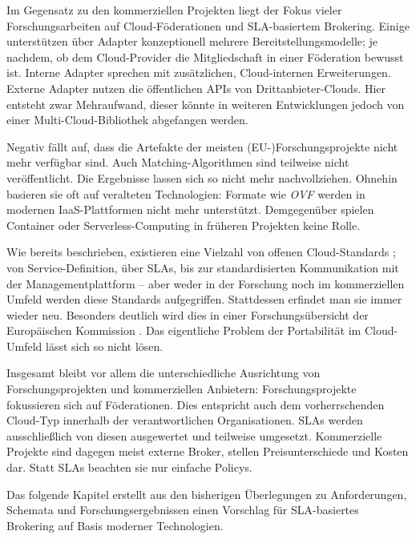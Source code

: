 
\noindent
Im Gegensatz zu den kommerziellen Projekten liegt der Fokus vieler Forschungsarbeiten auf Cloud-Föderationen und SLA-basiertem Brokering. Einige unterstützen über Adapter konzeptionell mehrere Bereitstellungsmodelle; je nachdem, ob dem Cloud-Provider die Mitgliedschaft in einer Föderation bewusst ist. Interne Adapter sprechen mit zusätzlichen, Cloud-internen Erweiterungen. Externe Adapter nutzen die öffentlichen APIs von Drittanbieter-Clouds. Hier entsteht zwar Mehraufwand, dieser könnte in weiteren Entwicklungen jedoch von einer Multi-Cloud-Bibliothek abgefangen werden.

Negativ fällt auf, dass die Artefakte der meisten (EU-)Forschungsprojekte
nicht mehr verfügbar sind. Auch Matching-Algorithmen sind teilweise nicht veröffentlicht. Die Ergebnisse lassen sich so nicht mehr nachvollziehen. Ohnehin basieren sie oft auf veralteten Technologien: Formate wie \emph{OVF} werden in modernen IaaS-Plattformen nicht mehr unterstützt. Demgegenüber spielen Container oder Serverless-Computing in früheren Projekten keine Rolle.

Wie bereits beschrieben, existieren eine Vielzahl von offenen Cloud-Standards \cite{bmwi:2012:cloud-standards}; von Service-Definition, über SLAs, bis zur standardisierten Kommunikation mit der Managementplattform -- aber weder in der Forschung noch im kommerziellen Umfeld werden diese Standards aufgegriffen. Stattdessen erfindet man sie immer wieder neu. Besonders deutlich wird dies in einer Forschungsübersicht der Europäischen Kommission \cite{blasi:2013:eu-projects-overview}. Das eigentliche Problem der Portabilität im Cloud-Umfeld lässt sich so nicht lösen.

Insgesamt bleibt vor allem die unterschiedliche Ausrichtung von Forschungsprojekten und kommerziellen Anbietern: Forschungsprojekte fokussieren sich auf Föderationen. Dies entspricht auch dem vorherrschenden Cloud-Typ innerhalb der verantwortlichen Organisationen. SLAs werden ausschließlich von diesen ausgewertet und teilweise umgesetzt. Kommerzielle Projekte sind dagegen meist externe Broker, stellen Preisunterschiede und Kosten dar. Statt SLAs beachten sie nur einfache Policys.

Das folgende Kapitel erstellt aus den bisherigen Überlegungen zu Anforderungen, Schemata und Forschungsergebnissen einen Vorschlag für SLA-basiertes Brokering auf Basis moderner Technologien.
